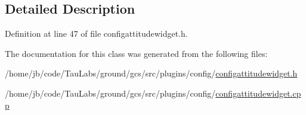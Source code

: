 \subsection{\-Detailed \-Description}


\-Definition at line 47 of file configattitudewidget.\-h.



\-The documentation for this class was generated from the following files\-:\begin{DoxyCompactItemize}
\item 
/home/jb/code/\-Tau\-Labs/ground/gcs/src/plugins/config/\hyperlink{configattitudewidget_8h}{configattitudewidget.\-h}\item 
/home/jb/code/\-Tau\-Labs/ground/gcs/src/plugins/config/\hyperlink{configattitudewidget_8cpp}{configattitudewidget.\-cpp}\end{DoxyCompactItemize}
